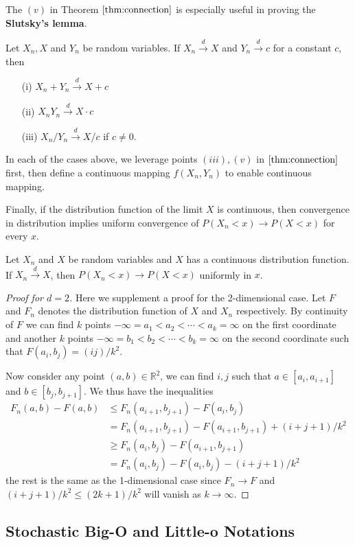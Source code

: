 \documentclass{article}
\begin{document}
The $(v)$ in Theorem $\ref{thm:connection}$ is especially useful in proving the \textbf{Slutsky's lemma}.
\begin{lemma}
    Let $X_n, X$ and $Y_n$ be random variables. If $X_n \xrightarrow{d} X$ and $Y_n \xrightarrow{d} c$ for a constant $c$, then
    \begin{enumerate}
        \item[(i)] $X_n + Y_n \xrightarrow{d} X + c$
        \item[(ii)] $X_n Y_n \xrightarrow{d} X \cdot c$
        \item[(iii)] $X_n / Y_n \xrightarrow{d} X / c$ if $c \neq 0$.
    \end{enumerate}
\end{lemma}
In each of the cases above, we leverage points $(iii), (v)$ in $\ref{thm:connection}$ first, then define a continuous mapping $f(X_n, Y_n)$ to enable continuous mapping.

Finally, if the distribution function of the limit $X$ is continuous, then convergence in distribution implies uniform convergence of $P(X_n < x) \to P(X < x)$ for every $x$.
\begin{lemma}
    Let $X_n$ and $X$ be random variables and $X$ has a continuous distribution function. If $X_n \xrightarrow{d} X$, then $P(X_n < x) \to P(X < x)$ uniformly in $x$.
\end{lemma}
\begin{proof}[Proof for $d = 2$]
    Here we supplement a proof for the 2-dimensional case. Let $F$ and $F_n$ denotes the distribution function of $X$ and $X_n$ respectively. By continuity of $F$ we can find $k$ points $-\infty = a_1 < a_2 < \cdots < a_{k} = \infty$ on the first coordinate and another $k$ points $-\infty = b_1 < b_2 < \cdots < b_{k} = \infty$ on the second coordinate such that $F(a_i, b_j) = (ij)/k^2$.

    Now consider any point $(a, b) \in \mathbb{R}^2$, we can find $i, j$ such that $a \in [a_i, a_{i+1}]$ and $b \in [b_j, b_{j+1}]$. We thus have the inequalities
    \begin{align}
        F_n(a, b) - F(a, b) &\leq F_n(a_{i+1}, b_{j+1}) - F(a_i, b_j) \\ &= F_n(a_{i+1}, b_{j+1}) - F(a_{i+1}, b_{j+1}) + (i + j + 1)/k^2 
        \\ &\geq F_n(a_{i}, b_{j}) - F(a_{i+1}, b_{j+1})
        \\ &= F_n(a_{i}, b_{j}) - F(a_{i}, b_{j}) - (i + j + 1)/k^2
    \end{align}
    the rest is the same as the 1-dimensional case since $F_n \to F$ and $(i + j + 1)/k^2 \leq (2k + 1)/k^2$ will vanish as $k \to \infty$.
\end{proof}

\subsection{Stochastic Big-O and Little-o Notations}
\end{document}
